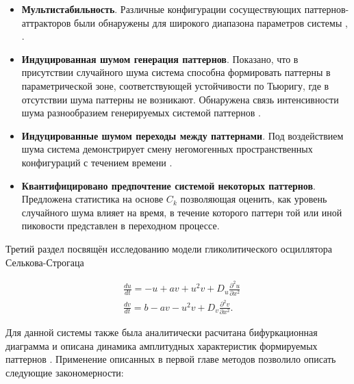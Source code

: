 \begin{itemize}
    \item \textbf{Мультистабильность}. Различные конфигурации сосуществующих паттернов-аттракторов были обнаружены для широкого диапазона параметров системы \cite{bib3}, \cite{bib4}.
    \item \textbf{Индуцированная шумом генерация паттернов}. Показано, что в присутствии случайного шума система способна формировать паттерны в параметрической зоне, соответствующей устойчивости по Тьюригу, где в отсутствии шума паттерны не возникают. Обнаружена связь интенсивности шума разнообразием генерируемых системой паттернов \cite{bib3}.
    \item \textbf{Индуцированные шумом переходы между паттернами}. Под воздействием шума система демонстрирует смену негомогенных пространственных конфигураций с течением времени \cite{bib4}.
    \item \textbf{Квантифицировано предпочтение системой некоторых паттернов}. Предложена статистика на основе $C_k$ позволяющая оценить, как уровень случайного шума влияет на время, в течение которого паттерн той или иной пиковости представлен в переходном процессе.
\end{itemize}

Третий раздел посвящён исследованию модели гликолитического осциллятора Селькова-Строгаца

\begin{equation}
    \begin{aligned}
        & \frac{d u}{d t}=-u+a v+u^2 v+D_u \frac{\partial^2 u}{\partial x^2} \\
        & \frac{d v}{d t}=b-a v-u^2 v+D_v \frac{\partial^2 v}{\partial x^2}.
        \end{aligned}
\end{equation}

Для данной системы также была аналитически расчитана бифуркационная диаграмма и описана динамика амплитудных характеристик формируемых паттернов \cite{bib5}. Применение описанных в первой главе методов позволило описать следующие закономерности:

